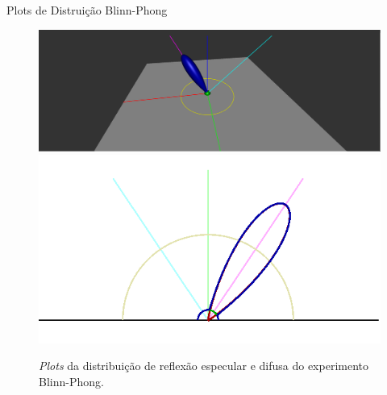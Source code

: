 \begin{frame}{Plots de Distruição Blinn-Phong}
\begin{figure}[H]
  
\caption{\small{\textit{Plots} da distribuição de reflexão especular e difusa do experimento Blinn-Phong.}}
    \label{fig-blinn-phong-plots}
    \vspace{42px}
  \includegraphics[width=\linewidth]{./Imagens/brdfs/blinn-phong-3D-plot}
\endminipage\hfill
{}
  \includegraphics[width=\linewidth]{./Imagens/brdfs/blinn-phong-polar-plot-log.png}
\endminipage\hfill
\end{figure}
\end{frame}

